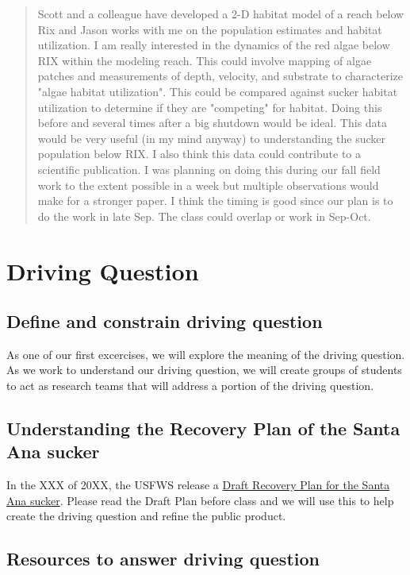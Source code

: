 \documentclass{article}\usepackage[]{graphicx}\usepackage[]{color}
\begin{document}
\begin{quote}
Scott and a colleague have developed a 2-D habitat model of a reach below Rix and Jason works with me on the population estimates and habitat utilization. I am really interested in the dynamics of the red algae below RIX within the modeling reach. This could involve mapping of algae patches and measurements of depth, velocity, and substrate to characterize "algae habitat utilization". This could be compared against sucker habitat utilization to determine if they are "competing" for habitat. Doing this before and several times after a big shutdown would be ideal. This data would be very useful (in my mind anyway) to understanding the sucker population below RIX. I also think this data could contribute to a scientific publication. I was planning on doing this during our fall field work to the extent possible in a week but multiple observations would make for a stronger paper. I think the timing is good since our plan is to do the work in late Sep. The class could overlap or work in Sep-Oct.
\end{quote}

\section{Driving Question}

\subsection{Define and constrain driving question}

As one of our first excercises, we will explore the meaning of the driving question. As we work to understand our driving question, we will create groups of students to act as research teams that will address a portion of the driving question.

\subsection{Understanding the Recovery Plan of the Santa Ana sucker}

In the XXX of 20XX, the USFWS release a \href{https://www.fws.gov/carlsbad/SpeciesStatusList/RP/201411xx_Draft%20RP_SASU.pdf}{Draft Recovery Plan for the Santa Ana sucker}. Please read the Draft Plan before class and we will use this to help create the driving question and refine the public product. 

\subsection{Resources to answer driving question}
\end{document}
